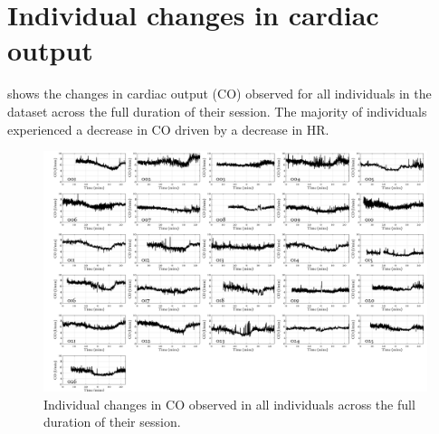 \documentclass[fleqn,10pt]{wlscirep}
\begin{document}
\clearpage
\section{Individual changes in cardiac output}

 shows the changes in cardiac output (CO) observed for all individuals in the dataset across the full duration of their session. The majority of individuals experienced a decrease in CO driven by a decrease in HR.

\begin{figure}[h!]
	\centering
	\includegraphics[width = \textwidth]{CO_profiles.png}
	\caption{Individual changes in CO observed in all individuals across the full duration of their session.}
	\label{fig:Individual_results_CO}
\end{figure}





\end{document}
